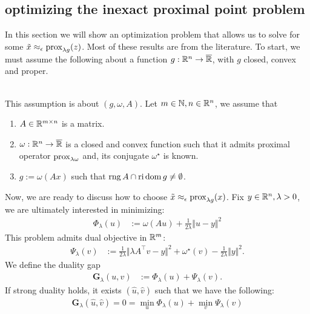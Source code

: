 \documentclass[12pt]{article}
\DeclareMathOperator{\rng}{\mathop{rng}}
\begin{document}
    \subsection{optimizing the inexact proximal point problem}
        In this section we will show an optimization problem that allows us to solve for some $\tilde x \approx_\epsilon \operatorname{prox}_{\lambda g}(z)$. 
        Most of these results are from the literature. 
        To start, we must assume the following about a function $g: \mathbb R^n \rightarrow \overline {\mathbb R}$, with $g$ closed, convex and proper. 
        \begin{assumption}\;\label{ass:for-inxt-prox}\\
            This assumption is about $(g, \omega, A)$. 
            Let $m \in \mathbb N, n \in \mathbb R^n$, we assume that 
            \begin{enumerate}[nosep]
                \item $A\in \mathbb R^{m \times n}$ is a matrix. 
                \item $\omega: \mathbb R^n \rightarrow \overline {\mathbb R}$ is a closed and convex function such that it admits proximal operator $\operatorname{prox}_{\lambda\omega}$ and, its conjugate $\omega^\star$ is known. 
                \item $g := \omega(Ax)$ such that $\rng A \cap \reli\dom g \neq\emptyset$. 
            \end{enumerate}
        \end{assumption}
        Now, we are ready to discuss how to choose $\tilde x \approx_\epsilon \operatorname{prox}_{\lambda g}(x)$. 
        Fix $y \in \mathbb R^n, \lambda > 0$, we are ultimately interested in minimizing: 
        \begin{align}
            \Phi_\lambda(u) &:= \omega(Au) + \frac{1}{2\lambda} \Vert u - y\Vert^2
        \end{align}
        This problem admits dual objective in $\mathbb R^m$: 
        \begin{align}
            \Psi_\lambda(v) &:=
            \frac{1}{2\lambda}\Vert \lambda A^\top v - y\Vert^2
            + \omega^\star(v) - \frac{1}{2\lambda}\Vert y\Vert^2. 
        \end{align}
        We define the duality gap
        \begin{align}
            \mathbf G_\lambda(u, v) &:= \Phi_\lambda(u) + \Psi_\lambda(v). 
        \end{align}
        If strong duality holds, it exists $(\hat u, \hat v)$ such that we have the following: 
        \begin{align*}
            \mathbf G_\lambda(\hat u, \hat v) = 0 = \min_{u} \Phi_\lambda(u) + \min_v \Psi_\lambda(v)
        \end{align*}
\end{document}
